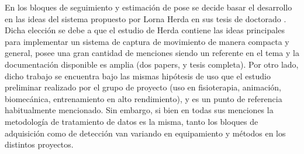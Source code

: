 En los bloques de seguimiento y estimación de pose se decide basar el desarrollo en las ideas del sistema propuesto por Lorna Herda en sus tesis de doctorado \cite{herda}. Dicha elección se debe a que el estudio de Herda contiene las ideas principales para implementar un sistema de captura de movimiento de manera compacta y general, posee una gran cantidad de menciones siendo un referente en el tema y la documentación disponible es amplia (dos papers, y tesis completa). Por otro lado, dicho trabajo se encuentra bajo las mismas hipótesis de uso que el estudio preliminar realizado por el grupo de proyecto (uso en fisioterapia, animación, biomecánica, entrenamiento en alto rendimiento), y es un punto de referencia habitualmente mencionado. Sin embargo, si bien en todas sus menciones la metodología de tratamiento de datos es la misma, tanto los bloques de adquisición como de detección van variando en equipamiento y métodos en los distintos proyectos.
